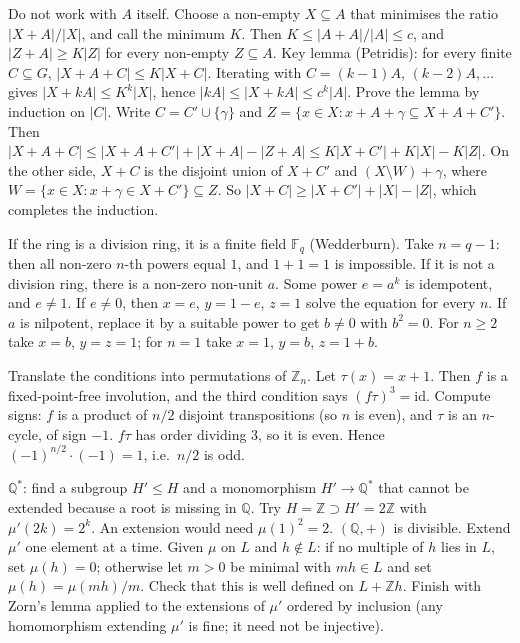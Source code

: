 \documentclass[11pt,a4paper]{article}
\begin{document}

 Do not work with $A$ itself. Choose a non-empty $X\subseteq A$ that minimises the ratio $|X+A|/|X|$, and call the minimum $K$. Then $K\le|A+A|/|A|\le c$, and $|Z+A|\ge K|Z|$ for every non-empty $Z\subseteq A$.
 Key lemma (Petridis): for every finite $C\subseteq G$, $|X+A+C|\le K|X+C|$. Iterating with $C=(k-1)A$, $(k-2)A,\dots$ gives $|X+kA|\le K^k|X|$, hence $|kA|\le|X+kA|\le c^k|A|$.
 Prove the lemma by induction on $|C|$. Write $C=C'\cup\{\gamma\}$ and $Z=\{x\in X: x+A+\gamma\subseteq X+A+C'\}$. Then $|X+A+C|\le|X+A+C'|+|X+A|-|Z+A|\le K|X+C'|+K|X|-K|Z|$.
 On the other side, $X+C$ is the disjoint union of $X+C'$ and $(X\setminus W)+\gamma$, where $W=\{x\in X: x+\gamma\in X+C'\}\subseteq Z$. So $|X+C|\ge|X+C'|+|X|-|Z|$, which completes the induction.

 If the ring is a division ring, it is a finite field $\mathbb F_q$ (Wedderburn). Take $n=q-1$: then all non-zero $n$-th powers equal $1$, and $1+1=1$ is impossible.
 If it is not a division ring, there is a non-zero non-unit $a$. Some power $e=a^k$ is idempotent, and $e\ne1$. If $e\ne0$, then $x=e$, $y=1-e$, $z=1$ solve the equation for every $n$.
 If $a$ is nilpotent, replace it by a suitable power to get $b\ne0$ with $b^2=0$. For $n\ge2$ take $x=b$, $y=z=1$; for $n=1$ take $x=1$, $y=b$, $z=1+b$.

 Translate the conditions into permutations of $\mathbb Z_n$. Let $\tau(x)=x+1$. Then $f$ is a fixed-point-free involution, and the third condition says $(f\tau)^3=\mathrm{id}$.
 Compute signs: $f$ is a product of $n/2$ disjoint transpositions (so $n$ is even), and $\tau$ is an $n$-cycle, of sign $-1$.
 $f\tau$ has order dividing $3$, so it is even. Hence $(-1)^{n/2}\cdot(-1)=1$, i.e.\ $n/2$ is odd.

 $\mathbb Q^*$: find a subgroup $H'\le H$ and a monomorphism $H'\to\mathbb Q^*$ that cannot be extended because a root is missing in $\mathbb Q$. Try $H=\mathbb Z\supset H'=2\mathbb Z$ with $\mu'(2k)=2^k$. An extension would need $\mu(1)^2=2$.
 $(\mathbb Q,+)$ is divisible. Extend $\mu'$ one element at a time. Given $\mu$ on $L$ and $h\notin L$: if no multiple of $h$ lies in $L$, set $\mu(h)=0$; otherwise let $m>0$ be minimal with $mh\in L$ and set $\mu(h)=\mu(mh)/m$. Check that this is well defined on $L+\mathbb Zh$.
 Finish with Zorn's lemma applied to the extensions of $\mu'$ ordered by inclusion (any homomorphism extending $\mu'$ is fine; it need not be injective).
\end{document}
